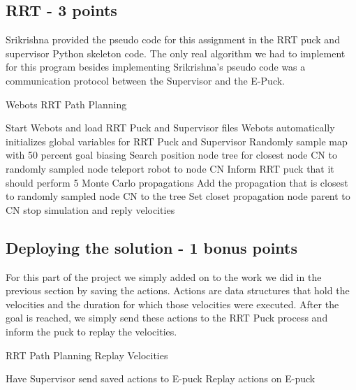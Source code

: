 \documentclass{article}
\numberwithin{equation}{section} %
\numberwithin{figure}{section} %
\numberwithin{table}{section} %
\begin{document}
\begin{framed}
\subsection{ RRT - 3 points}
\label{sec:RRT}

Srikrishna provided the pseudo code for this assignment in the RRT puck and supervisor Python skeleton code.  The only real algorithm we had to implement for this program besides implementing Srikrishna's pseudo code was a communication protocol between the Supervisor and the E-Puck.  

\begin{algorithm}[H]
\caption{Webots RRT Path Planning }\label{alg:cap}
\begin{algorithmic}[1] %
\State Start Webots and load RRT Puck and Supervisor files
\State Webots automatically initializes global variables for RRT Puck and Supervisor
\State Randomly sample map with 50 percent goal biasing 
\State Search position node tree for closest node CN to randomly sampled node 
\State teleport robot to node CN 
\State Inform RRT puck that it should perform 5 Monte Carlo propagations 
  \State Add the propagation that is closest to randomly sampled node CN to the tree 
  \State Set closet propagation node parent to CN 
\EndIf
{}
\State stop simulation and reply velocities
\EndIf
\EndWhile
\end{algorithmic}
\end{algorithm}

\subsection{ Deploying the solution - 1 bonus points}
\label{sec:RRT_bonus}

For this part of the project we simply added on to the work we did in the previous section by saving the actions.  Actions are data structures that hold the velocities and the duration for which those velocities were executed. After the goal is reached, we simply send these actions to the RRT Puck process and inform the puck to replay the velocities. 

\begin{algorithm}[H]
\caption{RRT Path Planning Replay Velocities }\label{alg:cap}
\begin{algorithmic}[1] %
\State Have Supervisor send saved actions to E-puck
\EndIf
{}
\State Replay actions on E-puck
\EndIf
\end{algorithmic}
\end{algorithm}


\end{framed}
\end{document}
